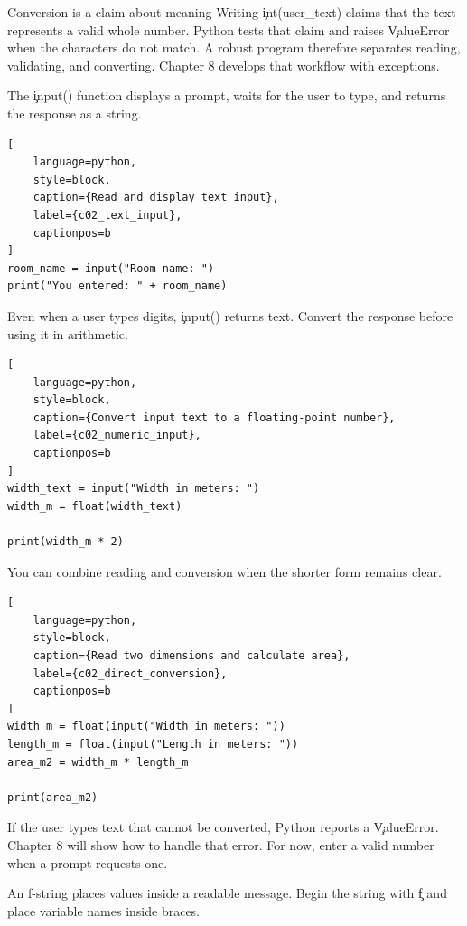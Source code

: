 \begin{ExplainBox}{Conversion is a claim about meaning}
Writing \c{int(user_text)} claims that the text represents a valid whole
number. Python tests that claim and raises \c{ValueError} when the characters
do not match. A robust program therefore separates reading, validating, and
converting. Chapter 8 develops that workflow with exceptions.
\end{ExplainBox}


The \c{input()} function displays a prompt, waits for the user to type, and
returns the response as a string.

\begin{lstlisting}[
    language=python,
    style=block,
    caption={Read and display text input},
    label={c02_text_input},
    captionpos=b
]
room_name = input("Room name: ")
print("You entered: " + room_name)
\end{lstlisting}

Even when a user types digits, \c{input()} returns text. Convert the response
before using it in arithmetic.

\begin{lstlisting}[
    language=python,
    style=block,
    caption={Convert input text to a floating-point number},
    label={c02_numeric_input},
    captionpos=b
]
width_text = input("Width in meters: ")
width_m = float(width_text)

print(width_m * 2)
\end{lstlisting}

You can combine reading and conversion when the shorter form remains clear.

\begin{lstlisting}[
    language=python,
    style=block,
    caption={Read two dimensions and calculate area},
    label={c02_direct_conversion},
    captionpos=b
]
width_m = float(input("Width in meters: "))
length_m = float(input("Length in meters: "))
area_m2 = width_m * length_m

print(area_m2)
\end{lstlisting}

If the user types text that cannot be converted, Python reports a
\c{ValueError}. Chapter 8 will show how to handle that error. For now, enter a
valid number when a prompt requests one.


An f-string places values inside a readable message. Begin the string with
\c{f} and place variable names inside braces.


